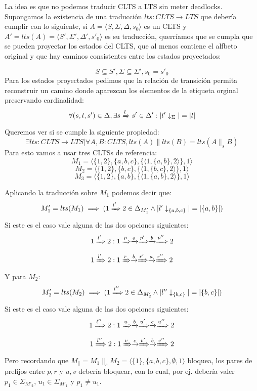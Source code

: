 La idea es que no podemos traducir CLTS a LTS sin meter deadlocks.
Supongamos la existencia de una traducción $lts:CLTS \rightarrow LTS$ que debería cumplir con lo siguiente, si $A=\langle S, \Sigma, \Delta, s_0 \rangle$ es un CLTS y $A'=lts(A)=\langle S', \Sigma', \Delta', s'_0 \rangle$ es su traducción, querríamos que se cumpla que se pueden proyectar los estados del CLTS, que al menos contiene el alfbeto original y que hay caminos consistentes entre los estados proyectados:

\[S \subseteq S', \Sigma \subseteq \Sigma', s_0 = s'_0\]
Para los estados proyectados pedimos que la relación de transición permita reconstruir un camino donde aparezcan los elementos de la etiqueta orginal preservando cardinalidad:
\[ \forall (s,l,s') \in \Delta, \exists s \xRightarrow[]{l} s' \in \Delta': |l'\downarrow_{\Sigma}| = |l| \]
Queremos ver si se cumple la siguiente propiedad:
\[\exists lts: CLTS \rightarrow LTS | \forall A,B:CLTS, lts(A) \parallel lts(B) = lts(A \parallel_s B)\]
Para esto vamos a usar tres CLTSs de referencia:
\[M_1 = \langle \lbrace 1,2 \rbrace, \lbrace a,b,c \rbrace, \lbrace\langle 1, \lbrace a,b \rbrace, 2 \rangle\rbrace, 1 \rangle\]
\[M_2 = \langle \lbrace 1,2 \rbrace, \lbrace b,c \rbrace, \lbrace \langle 1, \lbrace b,c \rbrace, 2 \rangle\rbrace, 1 \rangle\]
\[M_3 = \langle \lbrace 1,2 \rbrace, \lbrace a,b \rbrace, \lbrace \langle 1, \lbrace a,b \rbrace, 2 \rangle\rbrace, 1 \rangle\]

Aplicando la traducción sobre $M_1$ podemos decir que:
\[M'_1 = lts(M_1) \implies ( 1 \xRightarrow[]{l'} 2 \in \Delta_{M'_1} \wedge |l'\downarrow_{\lbrace a,b,c\rbrace}|= |\lbrace a, b \rbrace | )\]
Si este es el caso vale alguna de las dos opciones siguientes:
\[1 \xRightarrow[]{l'} 2: 1 \xRightarrow[]{p}\xrightarrow{a}\xRightarrow[]{p'}\xrightarrow{b}\xRightarrow[]{p''}2\]
\[1 \xRightarrow[]{l'} 2: 1 \xRightarrow[]{r}\xrightarrow{b}\xRightarrow[]{r'}\xrightarrow{a}\xRightarrow[]{r''}2\]
Y para $M_2$:
\[M'_2 = lts(M_2) \implies ( 1 \xRightarrow[]{l''} 2 \in \Delta_{M'_2} \wedge |l''\downarrow_{\lbrace b,c\rbrace}|= |\lbrace b,c \rbrace | )\]
Si este es el caso vale alguna de las dos opciones siguientes:
\[1 \xRightarrow[]{l''} 2: 1 \xRightarrow[]{u}\xrightarrow{b}\xRightarrow[]{u'}\xrightarrow{c}\xRightarrow[]{u''}2\]
\[1 \xRightarrow[]{l''} 2: 1 \xRightarrow[]{v}\xrightarrow{c}\xRightarrow[]{v'}\xrightarrow{b}\xRightarrow[]{v''}2\]
Pero recordando que $M_{\parallel}=M_1 \parallel_s M_2=\langle \lbrace 1 \rbrace, \lbrace a,b,c \rbrace, \emptyset, 1 \rangle$ bloquea, los pares de prefijos entre $p,r$ y $u,v$ debería bloquear, con lo cual, por ej. debería valer $p_1 \in \Sigma_{M'_2}$, $u_1 \in \Sigma_{M'_1}$ y $p_1 \neq u_1$.

